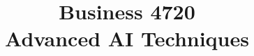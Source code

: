 \documentclass{article}
\title{Business 4720\\ \vspace{\baselineskip}
Advanced AI Techniques}
\begin{document}
\maketitle

\vfill

\clearpage


\end{document}
